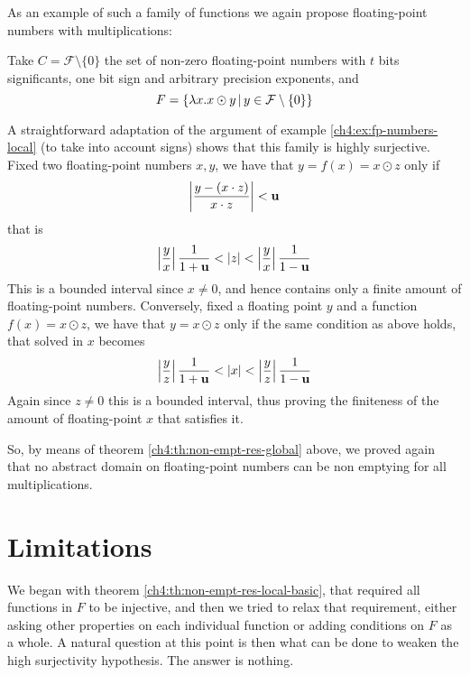 As an example of such a family of functions we again propose floating-point numbers with multiplications:
\begin{example}\label{ch4:ex:fp-numbers-global}
	Take $C = \mathcal{F} \setminus \{ 0 \}$ the set of non-zero floating-point numbers with $t$ bits significants, one bit sign and arbitrary precision exponents, and
	\[
	F = \{ \lambda x . x \odot y \,\vert\, y \in \mathcal{F} \setminus \{ 0 \} \}
	\]

	A straightforward adaptation of the argument of example \ref{ch4:ex:fp-numbers-local} (to take into account signs) shows that this family is highly surjective.
	Fixed two floating-point numbers $x, y$, we have that $y = f(x) = x \odot z$ only if
	\[
	\left\lvert \frac{y - (x \cdot z)}{x \cdot z} \right\rvert < \textbf{u}
	\]
	that is
	\[
	\left\lvert\frac{y}{x}\right\rvert \frac{1}{1+\textbf{u}} < \lvert z\rvert < \left\lvert\frac{y}{x}\right\rvert \frac{1}{1-\textbf{u}}
	\]
	This is a bounded interval since $x \neq 0$, and hence contains only a finite amount of floating-point numbers.
	Conversely, fixed a floating point $y$ and a function $f(x) = x \odot z$, we have that $y = x \odot z$ only if the same condition as above holds, that solved in $x$ becomes
	\[
	\left\lvert\frac{y}{z}\right\rvert \frac{1}{1+\textbf{u}} < \lvert x\rvert < \left\lvert\frac{y}{z}\right\rvert \frac{1}{1-\textbf{u}}
	\]
	Again since $z \neq 0$ this is a bounded interval, thus proving the finiteness of the amount of floating-point $x$ that satisfies it.

	So, by means of theorem \ref{ch4:th:non-empt-res-global} above, we proved again that no abstract domain on floating-point numbers can be non emptying for all multiplications.
\end{example}

\section{Limitations}
We began with theorem \ref{ch4:th:non-empt-res-local-basic}, that required all functions in $F$ to be injective, and then we tried to relax that requirement, either asking other properties on each individual function or adding conditions on $F$ as a whole.
A natural question at this point is then what can be done to weaken the high surjectivity hypothesis. The answer is nothing.

